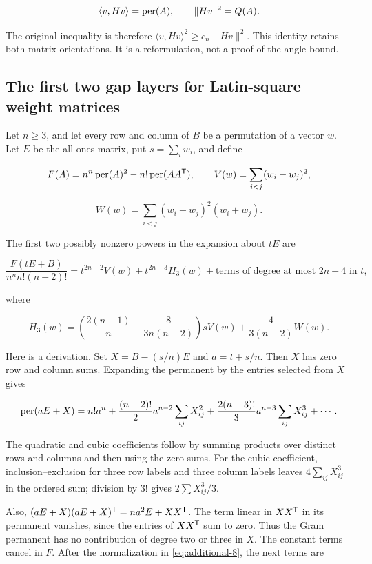 \[
\langle v,Hv\rangle=\operatorname{per}(A),\qquad
\|Hv\|^2=Q(A).
\]

The original inequality is therefore \(\langle v,Hv\rangle^2\ge c_n\|Hv\|^2\). This identity retains both matrix orientations. It is a reformulation, not a proof of the angle bound.

\subsection{The first two gap layers for Latin-square weight matrices}\label{app:additional-23}

Let \(n\ge3\), and let every row and column of \(B\) be a permutation of a vector \(w\). Let \(E\) be the all-ones matrix, put \(s=\sum_iw_i\), and define

\[
F(A)=n^n\operatorname{per}(A)^2-n!\operatorname{per}(AA^{\mathsf{T}}),\qquad
V(w)=\sum_{i<j}(w_i-w_j)^2,
\]

\[
W(w)=\sum_{i<j}(w_i-w_j)^2(w_i+w_j).
\]

The first two possibly nonzero powers in the expansion about \(tE\) are

\begin{equation}
\frac{F(tE+B)}{n^n n!(n-2)!}
=t^{2n-2}V(w)+t^{2n-3}H_3(w)
+\text{terms of degree at most }2n-4\text{ in }t,
\label{eq:additional-8}
\end{equation}

where

\begin{equation}
H_3(w)=\left(\frac{2(n-1)}n-\frac8{3n(n-2)}\right)sV(w)
+\frac4{3(n-2)}W(w).
\label{eq:additional-9}
\end{equation}

Here is a derivation. Set \(X=B-(s/n)E\) and \(a=t+s/n\). Then \(X\) has zero row and column sums. Expanding the permanent by the entries selected from \(X\) gives

\[
\operatorname{per}(aE+X)=n!a^n
+\frac{(n-2)!}{2}a^{n-2}\sum_{ij}X_{ij}^2
+\frac{2(n-3)!}{3}a^{n-3}\sum_{ij}X_{ij}^3
+\cdots.
\]

The quadratic and cubic coefficients follow by summing products over distinct rows and columns and then using the zero sums. For the cubic coefficient, inclusion--exclusion for three row labels and three column labels leaves \(4\sum_{ij}X_{ij}^3\) in the ordered sum; division by \(3!\) gives \(2\sum X_{ij}^3/3\).

Also, \((aE+X)(aE+X)^{\mathsf{T}}=na^2E+XX^{\mathsf{T}}\). The term linear in \(XX^{\mathsf{T}}\) in its permanent vanishes, since the entries of \(XX^{\mathsf{T}}\) sum to zero. Thus the Gram permanent has no contribution of degree two or three in \(X\). The constant terms cancel in \(F\). After the normalization in \eqref{eq:additional-8}, the next terms are

